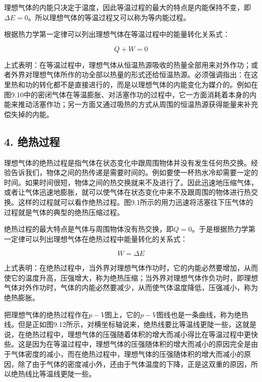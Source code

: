 理想气体的内能只决定于温度，因此等温过程的最大的特点是内能保持不变，即\(\Delta E = 0\)。所以理想气体的等温过程又可以称为等内能过程。

根据热力学第一定律可以列出理想气体在等温过程中的能量转化关系式：

\[
Q + W = 0 \tag {9.13}
\]

上式表明：在等温过程中，理想气体从恒温热源吸收的热量全部用来对外作功；或者外界对理想气体所作的功全部以热量的形式还给恒温热源。必须强调指出：在这里热和功的转化都不是直接进行的，而是以理想气体的内能变化为媒介的。例如在图9.10中的密闭气体在等温膨胀、对活塞作功的过程中，它一方面消耗着本身的内能来推动活塞作功；另一方面又通过吸热的方式从周围的恒温热源获得能量来补充偿失掉的内能。

\subsection{4. 绝热过程}\label{ux7eddux70edux8fc7ux7a0b}

理想气体的绝热过程是指气体在状态变化中跟周围物体并没有发生任何热交换。经验告诉我们，物体之间的热传递是需要时间的。例如要使一杯热水冷却需要一定的时间。如果时间很短，物体之间的热交换就来不及进行了。因此迅速地压缩气体，或者让气体迅速地膨胀，就可以使气体在状态变化中来不及跟周围的物体进行热交换。这样的过程就可以看作绝热过程。图9.1所示的用力迅速将活塞往下压气体的过程就是气体的典型的绝热压缩过程。

绝热过程的最大特点是气体与周围物体没有热交换，即\(Q = 0\)。于是根据热力学第一定律可以列出理想气体在绝热过程中能量转化的关系式：

\[
W = \Delta E \tag {9.14}
\]

上式表明：在绝热过程中，当外界对理想气体作功时，它的内能必然要增加，从而使它的温度升高，压强增大，称为绝热压缩；当外界对理想气体作负功时，即理想气体对外作功时，气体的内能必然要减少，从而使气体温度降低，压强减小，称为绝热膨胀。

把理想气体的绝热过程作在\(p - V\)图上，它的\(p - V\)图线也是一条曲线，称为绝热线。但是正如图9.12所示，对横坐标轴说来，绝热线要比等温线更陡一些，这就是说，在绝热过程中，理想气体的压强随着体积的增大而减小得比在等温过程中更快些。这是因为在等温过程中，理想气体的压强随体积的增大而减小的原因完全是由于气体密度的减小，而在绝热过程中，理想气体的压强随体积的增大而减小的原因，除了由于气体的密度减小外，还由于气体温度的下降，正是这双重的原因，所以绝热线比等温线更陡一些。

